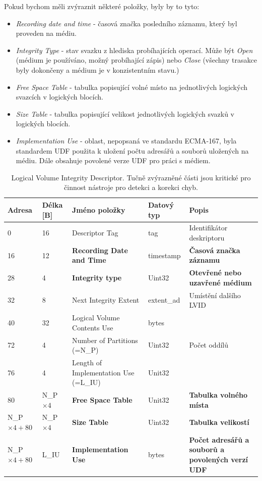 Pokud bychom měli zvýraznit některé položky, byly by to tyto:
\begin{itemize}
    \item \textit{Recording date and time} - časová značka posledního záznamu, který byl proveden na médiu.
    \item \textit{Integrity Type} - stav svazku z hlediska probíhajících operací. Může být \textit{Open} (médium je používáno, možný probíhající zápis) nebo \textit{Close} (všechny trasakce byly dokončeny a médium je v konzistentním stavu.)
    \item \textit{Free Space Table} - tabulka popisující volné místo na jednotlivých logických svazcích v logických blocích.
    \item \textit{Size Table} - tabulka popisující velikost jednotlivých logických svazků v logických blocích.
    \item \textit{Implementation Use} - oblast, nepopsaná ve standardu ECMA-167, byla standardem UDF použita k uložení počtu adresářů a souborů uložených na médiu. Dále obsahuje povolené verze UDF pro práci s médiem. 
\end{itemize}
\begin{table}[]
    \centering
    \begin{tabular}{ | l | l | p{3.7cm} | p{1.8cm} | p{4.2cm} | }
        \hline
        Adresa  & Délka [B]   & Jméno položky & Datový typ    & Popis \\ \hline\hline
        0   &16             & Descriptor Tag                    & tag           & Identifikátor deskriptoru \\ \hline
        16  &12             & \textbf{Recording Date and Time}  & timestamp     & \textbf{Časová značka záznamu} \\ \hline
        28  &4              & \textbf{Integrity type}           & Uint32        & \textbf{Otevřené nebo uzavřené médium} \\ \hline
        32  &8              & Next Integrity Extent             & extent\_ad    & Umístění dalšího LVID \\ \hline
        40  &32             & Logical Volume Contents Use       & bytes         &  \\ \hline
        72  &4              & Number of Partitions (=N\_P)      & Uint32        & Počet oddílů \\ \hline
        76  &4              & Length of Implementation Use (=L\_IU)& Unit32     &  \\ \hline
        80  &N\_P$\times4$  & \textbf{Free Space Table}         & Unit32        & \textbf{Tabulka volného místa} \\ \hline
        N\_P$\times4+80$ &N\_P$\times4$& \textbf{Size Table}    & Uint32        & \textbf{Tabulka velikostí} \\ \hline
        N\_P$\times4+80$ &L\_IU& \textbf{Implementation Use}    & bytes         & \textbf{Počet adresářů a souborů a povolených verzí UDF} \\ \hline
    \end{tabular}
    \caption{Logical Volume Integrity Descriptor. Tučně zvýrazněné části jsou kritické pro činnost nástroje pro detekci a korekci chyb.\label{tab:lvid}}
\end{table}

